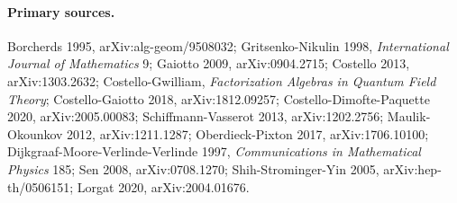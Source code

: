 \paragraph{Primary sources.}
Borcherds 1995, arXiv:alg-geom/9508032; Gritsenko-Nikulin 1998,
\emph{International Journal of Mathematics} 9; Gaiotto 2009,
arXiv:0904.2715; Costello 2013, arXiv:1303.2632; Costello-Gwilliam,
\emph{Factorization Algebras in Quantum Field Theory}; Costello-Gaiotto
2018, arXiv:1812.09257; Costello-Dimofte-Paquette 2020,
arXiv:2005.00083; Schiffmann-Vasserot 2013, arXiv:1202.2756;
Maulik-Okounkov 2012, arXiv:1211.1287; Oberdieck-Pixton 2017,
arXiv:1706.10100; Dijkgraaf-Moore-Verlinde-Verlinde 1997,
\emph{Communications in Mathematical Physics} 185; Sen 2008,
arXiv:0708.1270; Shih-Strominger-Yin 2005, arXiv:hep-th/0506151;
Lorgat 2020, arXiv:2004.01676.
